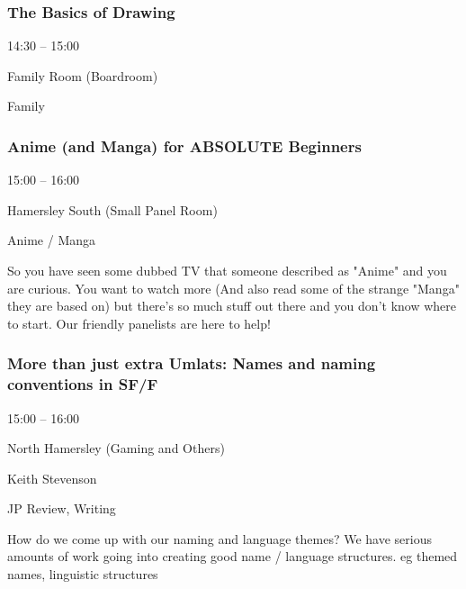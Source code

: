 \documentclass{scrreprt}
\begin{document}
\begin{multicols}{2}
\subsubsection*{The Basics of Drawing}\begin{description}
\setlength{\itemsep}{0pt}
\setlength{\parsep}{0pt}
\setlength{\parskip}{0pt}
\item[Time:]{14:30 -- 15:00}
\item[Venue:]{Family Room (Boardroom)}
\item[Tags:]{Family}\end{description}

\subsubsection*{Anime (and Manga) for ABSOLUTE Beginners}\begin{description}
\setlength{\itemsep}{0pt}
\setlength{\parsep}{0pt}
\setlength{\parskip}{0pt}
\item[Time:]{15:00 -- 16:00}
\item[Venue:]{Hamersley South (Small Panel Room)}
\item[Tags:]{Anime / Manga}\end{description}
So you have seen some dubbed TV that someone described as "Anime" and you are curious. You want to watch more (And also read some of the strange "Manga" they are based on) but there's so much stuff out there and you don't know where to start. Our friendly panelists are here to help!
\subsubsection*{More than just extra Umlats: Names and naming conventions in SF/F}\begin{description}
\setlength{\itemsep}{0pt}
\setlength{\parsep}{0pt}
\setlength{\parskip}{0pt}
\item[Time:]{15:00 -- 16:00}
\item[Venue:]{North Hamersley (Gaming and Others)}
\item[People:]{Keith Stevenson}
\item[Tags:]{JP Review, Writing}\end{description}
How do we come up with our naming and language themes? We have serious amounts of work going into creating good name / language structures. eg themed names, linguistic structures

\end{multicols}
\end{document}
